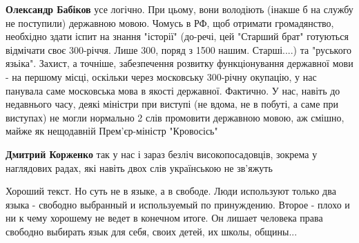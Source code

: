 \begin{itemize}
\begin{itemize}
\textbf{Олександр Бабіков} усе логічно. При цьому, вони володіють (інакше б на
службу не поступили) державною мовою. Чомусь в РФ, щоб отримати громадянство,
необхідно здати іспит на знання "історії" (до-речі, цей "Старший брат"
готуються відмічати своє 300-річчя. Лише 300, поряд з 1500 нашим. Старші....)
та "руського язьіка". Захист, а точніше, забезпечення розвитку функціонування
державної мови - на першому місці, оскільки через московську 300-річну
окупацію, у нас панувала саме московська мова в якості державної. Фактично. У
нас, навіть до недавнього часу, деякі міністри при виступі (не вдома, не в
побуті, а саме при виступах) не могли нормально 2 слів промовити державною
мовою, аж смішно, майже як нещодавній Прем'єр-міністр "Кровосісь"

 
\textbf{Дмитрий Корженко} так у нас і зараз безліч високопосадовців, зокрема у
наглядових радах, які навіть двох слів українською не зв’яжуть
\end{itemize}

\par
 

Хороший текст. Но суть не в языке, а в свободе. Люди используют только два
языка - свободно выбранный и используемый по принуждению. Второе - плохо и ни к
чему хорошему не ведет в конечном итоге. Он лишает человека права свободно
выбирать язык для себя, своих детей, их школы, общины...
\end{itemize}

